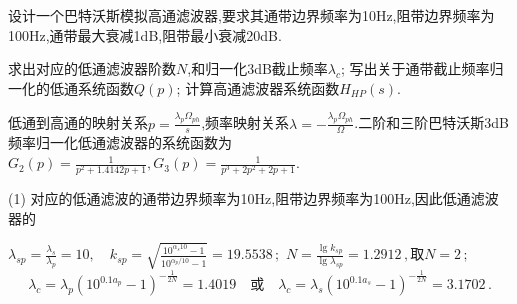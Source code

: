 \documentclass[list,answers,csize4,custom]{sysuexam}
\begin{document}
\begin{groups}
\begin{questions}[rs]
\begin{solution}
\begin{center}
        \end{center}
    \end{solution}
\end{questions}

\begin{questions}[rst]
    \question[10] 设计一个巴特沃斯模拟高通滤波器,要求其通带边界频率为10Hz,阻带边界频率为100Hz,通带最大衰减1dB,阻带最小衰减20dB.
    \begin{subquestions}
        \subquestion[3] 求出对应的低通滤波器阶数$N$,和归一化3dB截止频率$\lambda_c$;
        \subquestion[3] 写出关于通带截止频率归一化的低通系统函数$Q(p)$;
        \subquestion[4] 计算高通滤波器系统函数$H_{HP}(s)$.
    \end{subquestions}
    \hint 低通到高通的映射关系$p=\frac{\lambda_{p}\Omega_{ph}}{s}$,频率映射关系$\lambda=-\frac{\lambda_{p}\Omega_{ph}}{\Omega}$.二阶和三阶巴特沃斯3dB频率归一化低通滤波器的系统函数为$G_{2}(p)=\frac{1}{p^{2}+1.4142 p+1}, G_{3}(p)=\frac{1}{p^{3}+2 p^{2}+2 p+1}$.
    \begin{solution}[5cm]
        \answers (1) 对应的低通滤波的通带边界频率为10Hz,阻带边界频率为100Hz,因此低通滤波器的\par
        $\lambda_{s p}=\frac{\lambda_{s}}{\lambda_{p}}=10, \quad k_{s p}=\sqrt{\frac{10^{\alpha_{s} 10}-1}{10^{\alpha_{p} / 10}-1}}=19.5538\,;$
        $N=\frac{\lg k_{s p}}{\lg \lambda_{s p}}=1.2912\,, 取N=2\,;$
        $$\lambda_{c}=\lambda_{p}\left(10^{0.1 a_{p}}-1\right)^{-\frac{1}{2 N}}=1.4019\quad 或\quad \lambda_{c}=\lambda_{s}\left(10^{0.1 a_{s}}-1\right)^{-\frac{1}{2 N}}=3.1702\,.$$


\end{solution}
\end{questions}
\end{groups}
\end{document}
